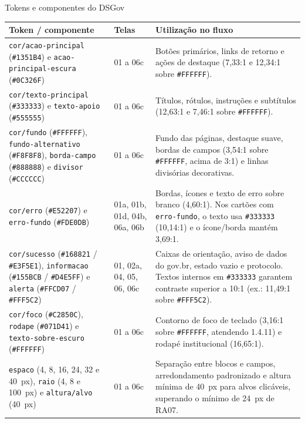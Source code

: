 \documentclass[
  12pt,
  oneside,
  a4paper,
  chapter=TITLE,
  section=TITLE,
  english,
  brazilian
]{abntex2}
\begin{document}
\begin{quadro}[!htbp]
  \caption{Tokens e componentes do DSGov}\label{qua:tokens-dsgov}
  \centering\footnotesize
  \begin{tabularx}{\textwidth}{|P{4.7cm}|P{2.1cm}|Y|}\hline
    Token / componente & Telas & Utilização no fluxo \\\hline
    \texttt{cor/acao-principal} (\texttt{\#1351B4}) e \texttt{acao-principal-escura} (\texttt{\#0C326F}) & 01 a 06c & Botões primários, links de retorno e ações de destaque (7,33:1 e 12,34:1 sobre \texttt{\#FFFFFF}). \\\hline
    \texttt{cor/texto-principal} (\texttt{\#333333}) e \texttt{texto-apoio} (\texttt{\#555555}) & 01 a 06c & Títulos, rótulos, instruções e subtítulos (12,63:1 e 7,46:1 sobre \texttt{\#FFFFFF}). \\\hline
    \texttt{cor/fundo} (\texttt{\#FFFFFF}), \texttt{fundo-alternativo} (\texttt{\#F8F8F8}), \texttt{borda-campo} (\texttt{\#888888}) e \texttt{divisor} (\texttt{\#CCCCCC}) & 01 a 06c & Fundo das páginas, destaque suave, bordas de campos (3,54:1 sobre \texttt{\#FFFFFF}, acima de 3:1) e linhas divisórias decorativas. \\\hline
    \texttt{cor/erro} (\texttt{\#E52207}) e \texttt{erro-fundo} (\texttt{\#FDE0DB}) & 01a, 01b, 01d, 04b, 06a, 06b & Bordas, ícones e texto de erro sobre branco (4,60:1). Nos cartões com \texttt{erro-fundo}, o texto usa \texttt{\#333333} (10,14:1) e o ícone/borda mantém 3,69:1. \\\hline
    \texttt{cor/sucesso} (\texttt{\#168821} / \texttt{\#E3F5E1}), \texttt{informacao} (\texttt{\#155BCB} / \texttt{\#D4E5FF}) e \texttt{alerta} (\texttt{\#FFCD07} / \texttt{\#FFF5C2}) & 01, 02a, 04, 05, 06, 06c & Caixas de orientação, aviso de dados do gov.br, estado vazio e protocolo. Textos internos em \texttt{\#333333} garantem contraste superior a 10:1 (ex.: 11,49:1 sobre \texttt{\#FFF5C2}). \\\hline
    \texttt{cor/foco} (\texttt{\#C2850C}), \texttt{rodape} (\texttt{\#071D41}) e \texttt{texto-sobre-escuro} (\texttt{\#FFFFFF}) & 01 a 06c & Contorno de foco de teclado (3,16:1 sobre \texttt{\#FFFFFF}, atendendo 1.4.11) e rodapé institucional (16,65:1). \\\hline
    \texttt{espaco} (4, 8, 16, 24, 32 e 40~px), \texttt{raio} (4, 8 e 100~px) e \texttt{altura/alvo} (40~px) & 01 a 06c & Separação entre blocos e campos, arredondamento padronizado e altura mínima de 40~px para alvos clicáveis, superando o mínimo de 24~px de RA07. \\\hline

\end{tabularx}
\end{quadro}
\end{document}
